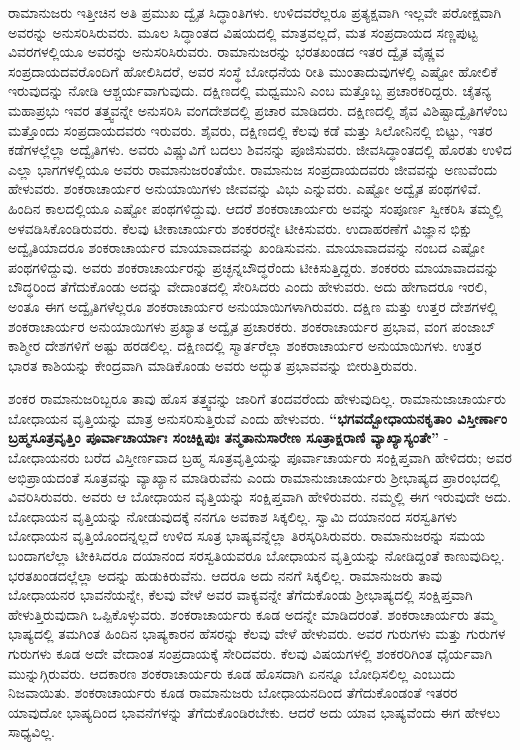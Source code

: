 ರಾಮಾನುಜರು ಇತ್ತೀಚಿನ ಅತಿ ಪ್ರಮುಖ ದ್ವೈತ ಸಿದ್ಧಾಂತಿಗಳು. ಉಳಿದವರೆಲ್ಲರೂ ಪ್ರತ್ಯಕ್ಷವಾಗಿ ಇಲ್ಲವೇ ಪರೋಕ್ಷವಾಗಿ ಅವರನ್ನು ಅನುಸರಿಸಿರುವರು. ಮೂಲ ಸಿದ್ಧಾಂತದ ವಿಷಯದಲ್ಲಿ ಮಾತ್ರವಲ್ಲದೆ, ಮತ ಸಂಪ್ರದಾಯದ ಸಣ್ಣಪುಟ್ಟ ವಿವರಗಳಲ್ಲಿಯೂ ಅವರನ್ನು ಅನುಸರಿಸಿರುವರು. ರಾಮಾನುಜರನ್ನು ಭರತಖಂಡದ ಇತರ ದ್ವೈತ ವೈಷ್ಣವ ಸಂಪ್ರದಾಯದವರೊಂದಿಗೆ ಹೋಲಿಸಿದರೆ, ಅವರ ಸಂಸ್ಥೆ ಬೋಧನೆಯ ರೀತಿ ಮುಂತಾದುವುಗಳಲ್ಲಿ ಎಷ್ಟೋ ಹೋಲಿಕೆ ಇರುವುದನ್ನು ನೋಡಿ ಆಶ್ಚರ್ಯವಾಗುವುದು. ದಕ್ಷಿಣದಲ್ಲಿ ಮಧ್ವಮುನಿ ಎಂಬ ಮತ್ತೊಬ್ಬ ಪ್ರಚಾರಕರಿದ್ದರು. ಚೈತನ್ಯ ಮಹಾಪ್ರಭು ಇವರ ತತ್ತ್ವವನ್ನೇ ಅನುಸರಿಸಿ ವಂಗದೇಶದಲ್ಲಿ ಪ್ರಚಾರ ಮಾಡಿದರು. ದಕ್ಷಿಣದಲ್ಲಿ ಶೈವ ವಿಶಿಷ್ಟಾದ್ವೈತಿಗಳೆಂಬ ಮತ್ತೊಂದು ಸಂಪ್ರದಾಯದವರು ಇರುವರು. ಶೈವರು, ದಕ್ಷಿಣದಲ್ಲಿ ಕೆಲವು ಕಡೆ ಮತ್ತು ಸಿಲೋನಿನಲ್ಲಿ ಬಿಟ್ಟು, ಇತರ ಕಡೆಗಳಲ್ಲೆಲ್ಲಾ ಅದ್ವೈತಿಗಳು. ಅವರು ವಿಷ್ಣುವಿಗೆ ಬದಲು ಶಿವನನ್ನು ಪೂಜಿಸುವರು. ಜೀವಸಿದ್ಧಾಂತದಲ್ಲಿ ಹೊರತು ಉಳಿದ ಎಲ್ಲಾ ಭಾಗಗಳಲ್ಲಿಯೂ ಅವರು ರಾಮಾನುಜರಂತೆಯೇ. ರಾಮಾನುಜ ಸಂಪ್ರದಾಯದವರು ಜೀವವನ್ನು ಅಣುವೆಂದು ಹೇಳುವರು. ಶಂಕರಾಚಾರ್ಯರ ಅನುಯಾಯಿಗಳು ಜೀವವನ್ನು ವಿಭು ಎನ್ನುವರು. ಎಷ್ಟೋ ಅದ್ವೈತ ಪಂಥಗಳಿವೆ. ಹಿಂದಿನ ಕಾಲದಲ್ಲಿಯೂ ಎಷ್ಟೋ ಪಂಥಗಳಿದ್ದುವು. ಆದರೆ ಶಂಕರಾಚಾರ್ಯರು ಅವನ್ನು ಸಂಪೂರ್ಣ ಸ್ವೀಕರಿಸಿ ತಮ್ಮಲ್ಲಿ ಅಳವಡಿಸಿಕೊಂಡಿರುವರು. ಕೆಲವು ಟೀಕಾಚಾರ್ಯರು ಶಂಕರರನ್ನೇ ಟೀಕಿಸುವರು. ಉದಾಹರಣೆಗೆ ವಿಜ್ಞಾನ ಭಿಕ್ಷು ಅದ್ವೈತಿಯಾದರೂ ಶಂಕರಾಚಾರ್ಯರ ಮಾಯಾವಾದವನ್ನು ಖಂಡಿಸುವನು. ಮಾಯಾವಾದವನ್ನು ನಂಬದ ಎಷ್ಟೋ ಪಂಥಗಳಿದ್ದುವು. ಅವರು ಶಂಕರಾಚಾರ್ಯರನ್ನು ಪ್ರಚ್ಛನ್ನಬೌದ್ಧರೆಂದು ಟೀಕಿಸುತ್ತಿದ್ದರು. ಶಂಕರರು ಮಾಯಾವಾದವನ್ನು ಬೌದ್ಧರಿಂದ ತೆಗೆದುಕೊಂಡು ಅದನ್ನು ವೇದಾಂತದಲ್ಲಿ ಸೇರಿಸಿದರು ಎಂದು ಹೇಳುವರು. ಅದು ಹೇಗಾದರೂ ಇರಲಿ, ಅಂತೂ ಈಗ ಅದ್ವೈತಿಗಳೆಲ್ಲರೂ ಶಂಕರಾಚಾರ್ಯರ ಅನುಯಾಯಿಗಳಾಗಿರುವರು. ದಕ್ಷಿಣ ಮತ್ತು ಉತ್ತರ ದೇಶಗಳಲ್ಲಿ ಶಂಕರಾಚಾರ್ಯರ ಅನುಯಾಯಿಗಳು ಪ್ರಖ್ಯಾತ ಅದ್ವೈತ ಪ್ರಚಾರಕರು. ಶಂಕರಾಚಾರ್ಯರ ಪ್ರಭಾವ, ವಂಗ ಪಂಜಾಬ್​ ಕಾಶ್ಮೀರ ದೇಶಗಳಿಗೆ ಅಷ್ಟು ಹರಡಲಿಲ್ಲ. ದಕ್ಷಿಣದಲ್ಲಿ ಸ್ಮಾರ್ತರೆಲ್ಲಾ ಶಂಕರಾಚಾರ್ಯರ ಅನುಯಾಯಿಗಳು. ಉತ್ತರ ಭಾರತ ಕಾಶಿಯನ್ನು ಕೇಂದ್ರವಾಗಿ ಮಾಡಿಕೊಂಡು ಅವರು ಅದ್ಭುತ ಪ್ರಭಾವವನ್ನು ಬೀರುತ್ತಿರುವರು.

ಶಂಕರ ರಾಮಾನುಜರಿಬ್ಬರೂ ತಾವು ಹೊಸ ತತ್ತ್ವವನ್ನು ಜಾರಿಗೆ ತಂದವರೆಂದು ಹೇಳುವುದಿಲ್ಲ. ರಾಮಾನುಜಾಚಾರ್ಯರು ಬೋಧಾಯನ ವೃತ್ತಿಯನ್ನು ಮಾತ್ರ ಅನುಸರಿಸುತ್ತಿರುವೆ ಎಂದು ಹೇಳುವರು. \textbf{“ಭಗವದ್ಬೋಧಾಯನಕೃತಾಂ ವಿಸ್ತೀರ್ಣಾಂ ಬ್ರಹ್ಮಸೂತ್ರವೃತ್ತಿಂ ಪೂರ್ವಾಚಾರ್ಯಾಃ ಸಂಚಿಕ್ಷಿಪುಃ ತನ್ಮತಾನುಸಾರೇಣ ಸೂತ್ರಾಕ್ಷರಾಣಿ ವ್ಯಾಖ್ಯಾಸ್ಯಂತೇ”} - ಬೋಧಾಯನರು ಬರೆದ ವಿಸ್ತೀರ್ಣವಾದ ಬ್ರಹ್ಮ ಸೂತ್ರವೃತ್ತಿಯನ್ನು ಪೂರ್ವಾಚಾರ್ಯರು ಸಂಕ್ಷಿಪ್ತವಾಗಿ ಹೇಳಿದರು; ಅವರ ಅಭಿಪ್ರಾಯದಂತೆ ಸೂತ್ರವನ್ನು ವ್ಯಾಖ್ಯಾನ ಮಾಡಿರುವೆನು ಎಂದು ರಾಮಾನುಜಾಚಾರ್ಯರು ಶ‍್ರೀಭಾಷ್ಯದ ಪ್ರಾರಂಭದಲ್ಲಿ ವಿವರಿಸಿರುವರು. ಅವರು ಆ ಬೋಧಾಯನ ವೃತ್ತಿಯನ್ನು ಸಂಕ್ಷಿಪ್ತವಾಗಿ ಹೇಳಿರುವರು. ನಮ್ಮಲ್ಲಿ ಈಗ ಇರುವುದೇ ಅದು. ಬೋಧಾಯನ ವೃತ್ತಿಯನ್ನು ನೋಡುವುದಕ್ಕೆ ನನಗೂ ಅವಕಾಶ ಸಿಕ್ಕಲಿಲ್ಲ. ಸ್ವಾಮಿ ದಯಾನಂದ ಸರಸ್ವತಿಗಳು ಬೋಧಾಯನ ವೃತ್ತಿಯೊಂದನ್ನಲ್ಲದೆ ಉಳಿದ ಸೂತ್ರ ಭಾಷ್ಯವನ್ನೆಲ್ಲಾ ತಿರಸ್ಕರಿಸಿರುವರು. ರಾಮಾನುಜರನ್ನು ಸಮಯ ಬಂದಾಗಲೆಲ್ಲಾ ಟೀಕಿಸಿದರೂ ದಯಾನಂದ ಸರಸ್ವತಿಯವರೂ ಬೋಧಾಯನ ವೃತ್ತಿಯನ್ನು ನೋಡಿದ್ದಂತೆ ಕಾಣುವುದಿಲ್ಲ. ಭರತಖಂಡದಲ್ಲೆಲ್ಲಾ ಅದನ್ನು ಹುಡುಕಿರುವೆನು. ಆದರೂ ಅದು ನನಗೆ ಸಿಕ್ಕಲಿಲ್ಲ. ರಾಮಾನುಜರು ತಾವು ಬೋಧಾಯನರ ಭಾವನೆಯನ್ನೇ, ಕೆಲವು ವೇಳೆ ಅವರ ವಾಕ್ಯವನ್ನೇ ತೆಗೆದುಕೊಂಡು ಶ‍್ರೀಭಾಷ್ಯದಲ್ಲಿ ಸಂಕ್ಷಿಪ್ತವಾಗಿ ಹೇಳುತ್ತಿರುವುದಾಗಿ ಒಪ್ಪಿಕೊಳ್ಳುವರು. ಶಂಕರಾಚಾರ್ಯರು ಕೂಡ ಅದನ್ನೇ ಮಾಡಿದರಂತೆ. ಶಂಕರಾಚಾರ್ಯರು ತಮ್ಮ ಭಾಷ್ಯದಲ್ಲಿ ತಮಗಿಂತ ಹಿಂದಿನ ಭಾಷ್ಯಕಾರನ ಹೆಸರನ್ನು ಕೆಲವು ವೇಳೆ ಹೇಳುವರು. ಅವರ ಗುರುಗಳು ಮತ್ತು ಗುರುಗಳ ಗುರುಗಳು ಕೂಡ ಅದೇ ವೇದಾಂತ ಸಂಪ್ರದಾಯಕ್ಕೆ ಸೇರಿದವರು. ಕೆಲವು ವಿಷಯಗಳಲ್ಲಿ ಶಂಕರರಿಗಿಂತ ಧೈರ್ಯವಾಗಿ ಮುನ್ನುಗ್ಗಿರುವರು. ಆದಕಾರಣ ಶಂಕರಾಚಾರ್ಯರು ಕೂಡ ಹೊಸದಾಗಿ ಏನನ್ನೂ ಬೋಧಿಸಲಿಲ್ಲ ಎಂಬುದು ನಿಜವಾಯಿತು. ಶಂಕರಾಚಾರ್ಯರು ಕೂಡ ರಾಮಾನುಜರು ಬೋಧಾಯನದಿಂದ ತೆಗೆದುಕೊಂಡಂತೆ ಇತರರ ಯಾವುದೋ ಭಾಷ್ಯದಿಂದ ಭಾವನೆಗಳನ್ನು ತೆಗೆದುಕೊಂಡಿರಬೇಕು. ಆದರೆ ಅದು ಯಾವ ಭಾಷ್ಯವೆಂದು ಈಗ ಹೇಳಲು ಸಾಧ್ಯವಿಲ್ಲ.

